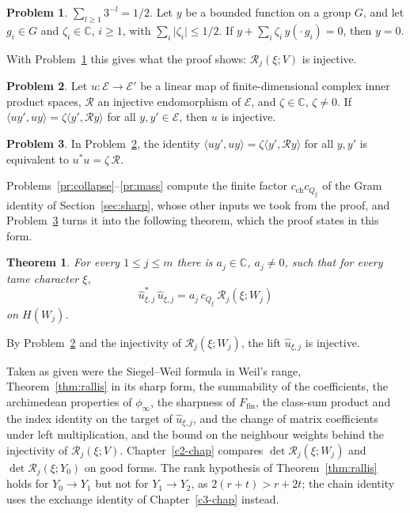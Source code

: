 \documentclass[reqno]{amsart}
\newcounter{chap}
\theoremstyle{definition}
\newtheorem{problem}{Problem}[section]
\theoremstyle{plain}
\newtheorem{theorem}{Theorem}[section]
\newcommand{\C}{\mathbb{C}}
\newcommand{\Rc}{\mathcal{R}}
\newcommand{\cch}{c_{\mathrm{ch}}}
\newcommand{\uh}{\hat u}
\begin{document}
\begin{problem}\label{pr:half}
\(\sum_{l \ge 1} 3^{-l} = 1/2\).  Let \(y\) be a bounded function on a group \(G\), and let \(g_i \in G\) and \(\zeta_i \in \C\), \(i \ge 1\), with \(\sum_i \lvert \zeta_i\rvert \le 1/2\).  If \(y + \sum_i \zeta_i\, y(\cdot\, g_i) = 0\), then \(y = 0\).
\end{problem}

With Problem~\ref{pr:half} this gives what the proof shows: \(\Rc_j(\xi; V)\) is injective.

\begin{problem}\label{pr:injective}
Let \(u \colon \mathcal E \to \mathcal E'\) be a linear map of finite-dimensional complex inner product spaces, \(\Rc\) an injective endomorphism of \(\mathcal E\), and \(\zeta \in \C\), \(\zeta \ne 0\).  If \(\langle u y', u y\rangle = \zeta \langle y', \Rc y\rangle\) for all \(y, y' \in \mathcal E\), then \(u\) is injective.
\end{problem}

\begin{problem}\label{pr:operator}
In Problem~\ref{pr:injective}, the identity \(\langle u y', u y\rangle = \zeta \langle y', \Rc y\rangle\) for all \(y, y'\) is equivalent to \(u^* u = \zeta\, \Rc\).
\end{problem}

Problems~\ref{pr:collapse}--\ref{pr:mass} compute the finite factor \(\cch c_{Q_\xi}\) of the Gram identity of Section~\ref{sec:sharp}, whose other inputs we took from the proof, and Problem~\ref{pr:operator} turns it into the following theorem, which the proof states in this form.

\begin{theorem}\label{thm:one-lift}
For every \(1 \le j \le m\) there is \(a_j \in \C\), \(a_j \ne 0\), such that for every tame character \(\xi\),
\[
  \uh_{\xi,j}^*\, \uh_{\xi,j} = a_j\, c_{Q_\xi}\, \Rc_j(\xi; W_j)
\]
on \(H(W_j)\).
\end{theorem}

By Problem~\ref{pr:injective} and the injectivity of \(\Rc_j(\xi; W_j)\), the lift \(\uh_{\xi,j}\) is injective.

Taken as given were the Siegel--Weil formula in Weil's range, Theorem~\ref{thm:rallis} in its sharp form, the summability of the coefficients, the archimedean properties of \(\phi_\infty\), the sharpness of \(F_{\mathrm{fin}}\), the class-sum product and the index identity on the target of \(\uh_{\xi,j}\), and the change of matrix coefficients under left multiplication, and the bound on the neighbour weights behind the injectivity of \(\Rc_j(\xi; V)\).  Chapter~\ref{c2-chap} compares \(\det \Rc_j(\xi; W_j)\) and \(\det \Rc_j(\xi; Y_0)\) on good forms.  The rank hypothesis of Theorem~\ref{thm:rallis} holds for \(Y_0 \to Y_1\) but not for \(Y_1 \to Y_2\), as \(2(r + t) > r + 2t\); the chain identity uses the exchange identity of Chapter~\ref{c3-chap} instead.
\end{document}
